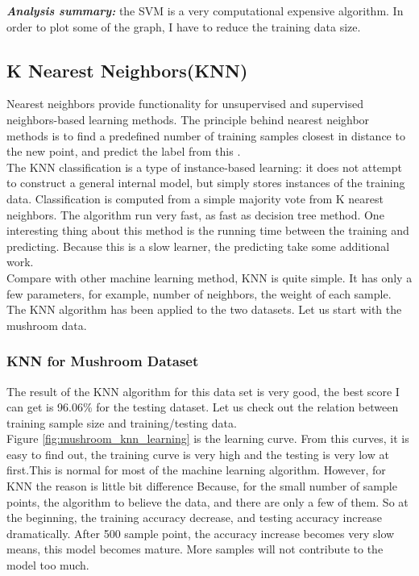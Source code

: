 \documentclass[10pt, conference, compsocconf]{IEEEtran}
\begin{document}
\textit{\textbf{Analysis summary:}} the SVM is a very computational expensive algorithm. In order to plot some of the graph, I have to reduce the training data size. 

\subsection{ K Nearest Neighbors(KNN)}
 Nearest neighbors provide functionality for unsupervised and supervised neighbors-based learning methods. The principle behind nearest neighbor methods is to find a predefined number of training samples closest in distance to the new point, and predict the label from this \cite{nn}.\\ 
The KNN classification is a type of instance-based learning: it does not attempt to construct a general internal model, but simply stores instances of the training data. Classification is computed from a simple majority vote from K nearest neighbors. The algorithm run very fast, as fast as decision tree method. One interesting thing about this method is the running time between the training and predicting. Because this is a slow learner, the predicting take some additional work.\\
Compare with other machine learning method, KNN is quite simple. It has only a few parameters, for example, number of neighbors, the weight of each sample. The KNN algorithm has been applied to the two datasets. Let us start with the mushroom data.

\subsubsection{KNN for Mushroom Dataset}
The result of the KNN algorithm for this data set is very good, the best score I can get is 96.06\% for the testing dataset. Let us check out the relation between training sample size and training/testing data.\\
Figure \ref{fig:mushroom_knn_learning} is the learning curve. From this curves, it is easy to find out, the training curve is very high and the testing is very low at first.This is normal for most of the machine learning algorithm. However, for KNN the reason is little bit difference Because, for the small number of sample points, the algorithm to believe the data, and there are only a few of them. So at the beginning, the training accuracy decrease, and testing accuracy increase dramatically. After 500 sample point, the accuracy increase becomes very slow means, this model becomes mature.  More samples will not contribute to the model too much. 
\end{document}
